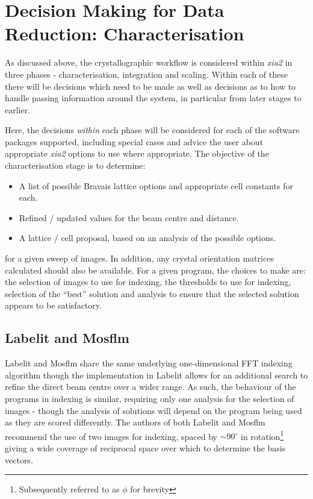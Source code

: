 \documentclass[preprint,pdf]{iucr}
\begin{document}
\section{Decision Making for Data Reduction: Characterisation}

As discussed above, the crystallographic workflow is considered within
\emph{xia2} in three phases - characterisation, integration and
scaling. Within each of these there will be decisions which need to be
made as well as decisions as to how to handle passing information
around the system, in particular from later stages to earlier. 

Here, the decisions \emph{within} each phase will be considered for
each of the software packages supported, including special cases and
advice the user about appropriate \emph{xia2} options to use where
appropriate. The objective of the characterisation stage is to determine:

\begin{itemize}
\item{A list of possible Bravais lattice options and appropriate cell
    constants for each.}
\item{Refined / updated values for the beam centre and distance.}
\item{A lattice / cell proposal, based on an analysis of the possible
    options.}
\end{itemize}

\noindent
for a given sweep of images. In addition, any crystal orientation
matrices calculated
should also be available. For a given program, the choices to make
are: the selection of images to use for indexing, the thresholds to
use for indexing, selection of the ``best'' solution and analysis to
ensure that the selected solution appears to be satisfactory. 

\subsection{Labelit and Mosflm}

Labelit and Mosflm share the same underlying one-dimensional FFT
indexing algorithm \cite{Steller:mf0013} though the
implementation in Labelit allows for an additional search to refine
the direct beam centre over a wider range. As such, the behaviour of
the programs in indexing is similar, requiring only one analysis for
the selection of images - though the analysis of solutions will depend
on the program being used as they are scored differently.
The authors of both Labelit and Mosflm recommend the use of two images
for indexing, spaced by $\sim 90^{\circ}$ in rotation\footnote{Subsequently
referred to as $\phi$ for brevity} giving a wide coverage of
reciprocal space over which to determine the basis vectors. 
\end{document}
